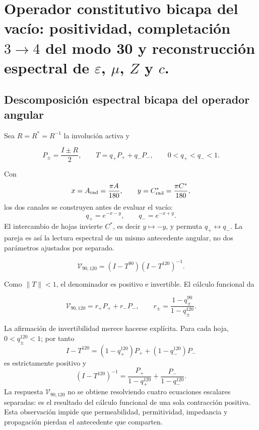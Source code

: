 \chapter{Operador constitutivo bicapa del vacío: positividad, completación \texorpdfstring{\(3\to4\)}{3→4} del modo 30 y reconstrucción espectral de \texorpdfstring{\(\varepsilon\)}{ε}, \texorpdfstring{\(\mu\)}{μ}, \texorpdfstring{\(Z\)}{Z} y \texorpdfstring{\(c\)}{c}.}
\label{chap:p3-83-31-vacio_epsilon_mu_z_c}

\section{Descomposici\'on espectral bicapa del operador angular}

Sea \(R=R^*=R^{-1}\) la involuci\'on activa y

\[
P_\pm=\frac{I\pm R}{2},
\qquad
T=q_+P_+ +q_-P_-,
\qquad 0<q_+<q_-<1.
\]

Con
\[
x=A_{\rm rad}=\frac{\pi A}{180},\qquad
y=C^*_{\rm rad}=\frac{\pi C^*}{180},
\]
los dos canales se construyen antes de evaluar el vac\'io:
\begin{equation}
q_+=e^{-x-y},\qquad q_-=e^{-x+y}.
\label{p3-83-c31-s1:eq:vacuum-angular-channels}
\end{equation}
El intercambio de hojas invierte \(C^*\), es decir \(y\mapsto-y\), y permuta \(q_+\leftrightarrow q_-\). La pareja es as\'i la lectura espectral de un mismo antecedente angular, no dos par\'ametros ajustados por separado.

\begin{definition}
\begin{equation}
\mathcal V_{90,120}=(I-T^{90})(I-T^{120})^{-1}.
\label{p3-83-c31-s1:eq:vacuum-operator}
\end{equation}
\end{definition}

Como \(\|T\|<1\), el denominador es positivo e invertible. El c\'alculo funcional da

\begin{equation}
\mathcal V_{90,120}=r_+P_+ +r_-P_-,
\qquad
r_\pm=\frac{1-q_\pm^{90}}{1-q_\pm^{120}}.
\label{p3-83-c31-s1:eq:vacuum-eigenvalues}
\end{equation}

La afirmaci\'on de invertibilidad merece hacerse expl\'icita. Para cada hoja,
\(0<q_\pm^{120}<1\); por tanto
\[
I-T^{120}=(1-q_+^{120})P_++(1-q_-^{120})P_-
\]
es estrictamente positivo y
\[
(I-T^{120})^{-1}
=\frac{P_+}{1-q_+^{120}}+
 \frac{P_-}{1-q_-^{120}}.
\]
La respuesta \(\mathcal V_{90,120}\) no se obtiene resolviendo cuatro
ecuaciones escalares separadas: es el resultado del c\'alculo funcional de una
sola contracci\'on positiva. Esta observaci\'on impide que permeabilidad,
permitividad, impedancia y propagaci\'on pierdan el antecedente que comparten.

